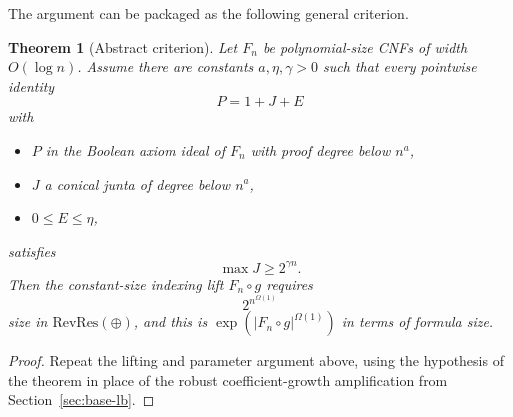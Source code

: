 \documentclass[11pt]{article}
\newtheorem{theorem}{Theorem}[section]
\theoremstyle{definition}
\newcommand{\RevRes}{\mathrm{RevRes}}
\begin{document}
The argument can be packaged as the following general criterion.

\begin{theorem}[Abstract criterion]\label{thm:abstract}
Let $F_n$ be polynomial-size CNFs of width $O(\log n)$.
Assume there are constants $a,\eta,\gamma>0$ such that every pointwise identity
\[
  P=1+J+E
\]
with
\begin{itemize}
\item $P$ in the Boolean axiom ideal of $F_n$ with proof degree below $n^a$,
\item $J$ a conical junta of degree below $n^a$,
\item $0\le E\le\eta$,
\end{itemize}
satisfies
\[
  \max J\ge2^{\gamma n}.
\]
Then the constant-size indexing lift $F_n\circ g$ requires
\[
  2^{n^{\Omega(1)}}
\]
size in $\RevRes(\oplus)$, and this is
$\exp(|F_n\circ g|^{\Omega(1)})$ in terms of formula size.
\end{theorem}

\begin{proof}
Repeat the lifting and parameter argument above, using the hypothesis of the theorem in place of the robust coefficient-growth amplification from Section~\ref{sec:base-lb}.
\end{proof}

\nocite{AG}


\end{document}
